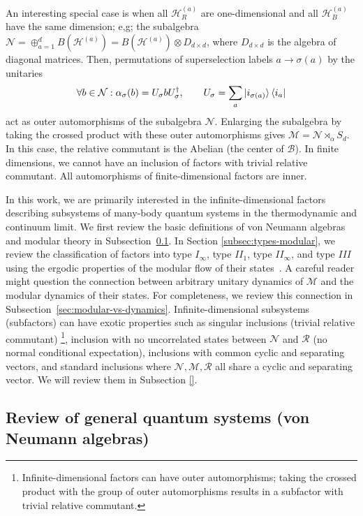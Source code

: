 \documentclass[a4paper,11pt]{article}
\theoremstyle{definition}
\newcommand{\mB}{\mathcal{B}}%
\newcommand{\mR}{\mathcal{R}}
\newcommand{\mN}{\mathcal{N}}
\newcommand{\mH}{\mathcal{H}}
\newcommand{\mM}{\mathcal{M}}
\begin{document}
An interesting special case is when all $\mH_R^{(a)}$ are one-dimensional and all $\mH_B^{(a)}$ have the same dimension; e,g; the subalgebra $\mN=\oplus_{a=1}^d B(\mH^{(a)})=B(\mH^{(a)})\otimes D_{d\times d}$, where $D_{d\times d}$ is the algebra of diagonal matrices. Then, permutations of superselection labels $a\to \sigma(a)$ by the unitaries
 \begin{align}
    \forall b\in\mN: \alpha_\sigma(b)=U_\sigma b U_\sigma^\dagger,\qquad U_{\sigma}=\sum_a \ket{i_{\sigma(a)}}\bra{i_a}
 \end{align}
act as outer automorphisms of the subalgebra $\mN$.
Enlarging the subalgebra by taking the crossed product with these outer automorphisms gives $\mM=\mN\rtimes_\alpha S_d$. In this case, the relative commutant is the Abelian (the center of $\mB$). In finite dimensions, we cannot have an inclusion of factors with trivial relative commutant. All automorphisms of finite-dimensional factors are inner.


In this work, we are primarily interested in the infinite-dimensional factors describing subsystems of many-body quantum systems in the thermodynamic and continuum limit. We first review the basic definitions of von Neumann algebras and modular theory in Subsection~\ref{app:vN}. In Section \ref{subsec:types-modular}, we review the classification of factors into type $I_\infty$, type $II_1$, type $II_\infty$, and type $III$ using the ergodic properties of the modular flow of their states~\cite{Takesaki1970,Connes1973}. A careful reader might question the connection between arbitrary unitary dynamics of $\mM$ and the modular dynamics of their states. For completeness, we review this connection in  Subsection~\ref{sec:modular-vs-dynamics}. Infinite-dimensional subsystems (subfactors) can have exotic properties such as singular inclusions (trivial relative commutant) \footnote{Infinite-dimensional factors can have outer automorphisms; taking the crossed product with the group of outer automorphisms results in a subfactor with trivial relative commutant.}, inclusion with no uncorrelated states between $\mN$ and $\mR$ (no normal conditional expectation), inclusions with common cyclic and separating vectors, and standard inclusions where $\mN,\mM,\mR$ all share a cyclic and separating vector. We will review them in Subsection \ref{}.

\subsection{Review of general quantum systems (von Neumann algebras)}\label{app:vN}
\end{document}

